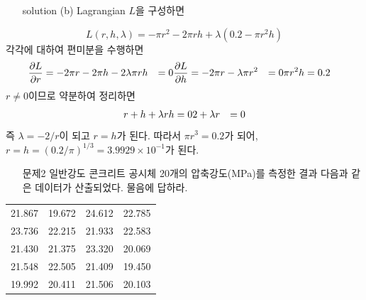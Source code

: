 \documentclass[a4,10pt]{article}
\theoremstyle{examplestyle}
\let\\\tabularnewline
\let\\\tabularnewline
\begin{document}
\begin{itemize}
\item[solution (b)] Lagrangian $L$을 구성하면
\end{itemize}
\begin{equation*}
L(r,h,\lambda)=-\pi r^{2}-2\pi rh+\lambda\left(0.2-\pi r^{2}h\right)
\end{equation*}
각각에 대하여 편미분을 수행하면
\begin{align*}
\frac{\partial L}{\partial r}&=-2\pi r-2\pi h -2\lambda\pi rh\\
&=0\\
\frac{\partial L}{\partial h}&=-2\pi r -\lambda\pi r^{2}\\
&=0\\
\pi r^{2}h&=0.2
\end{align*}
$r\neq0$이므로 약분하여 정리하면
\begin{align*}
r+h+\lambda rh&=0\\
2+\lambda r&=0
\end{align*}
즉 $\lambda=-2/r$이 되고 $r=h$가 된다. 따라서 $\pi r^{3}=0.2$가 되어, $r=h=\left(0.2/\pi\right)^{1/3}=3.9929\times 10^{-1}$가 된다.
\begin{itemize}
\item[문제2] 일반강도 콘크리트 공시체 20개의 압축강도(MPa)를 측정한 결과 다음과 같은 데이터가 산출되었다. 물음에 답하라.
\end{itemize}
\begin{table}[!hbt]
\centering
\begin{tabular}{llll}
\hline\hline
21.867&19.672&24.612&22.785\\
23.736&22.215&21.933&22.583\\
21.430&21.375&23.320&20.069\\
21.548&22.505&21.409&19.450\\
19.992&20.411&21.506&20.103\\
\hline\hline
\end{tabular}
\end{table}
\end{document}
